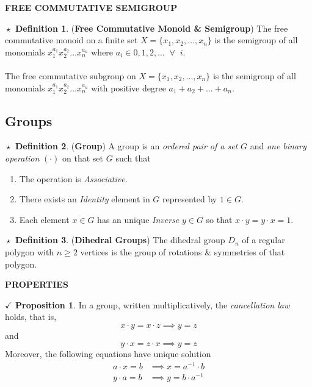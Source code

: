 \documentclass{article}
\theoremstyle{definition}
\newtheorem{definition}{$\boxed{\star}$ Definition}
\theoremstyle{remark}
\theoremstyle{definition}
\theoremstyle{definition}
\newtheorem{proposition}{$\checkmark$ Proposition}
\theoremstyle{definition}
\theoremstyle{proof}
\newcommand{\inv}[1]{#1^{-1}}
\begin{document}
\hrulefill
\textbf{FREE COMMUTATIVE SEMIGROUP}
\hrulefill
\begin{definition}
	(\textbf{Free Commutative Monoid \& Semigroup}) The free commutative monoid on a finite set $ X = \{x_1,x_2,\dots,x_n\} $ is the semigroup of all monomials $ x_1^{a_1}x_2^{a_2}\dots x_n^{a_n} $ where $ a_i \in 0,1,2,\dots\;\;\forall\;\;i $.\\\\
	The free commutative subgroup on $ X = \{x_1,x_2,\dots,x_n\} $ is the semigroup of all monomials $ x_1^{a_1}x_2^{a_2}\dots x_n^{a_n} $ with positive degree $ a_1 + a_2 + \dots + a_n $.
\end{definition}
\hrulefill
\newpage
\subsection{Groups}
\begin{definition}
(\textbf{Group})	A group is an \textit{ordered pair of a set} $ G $ and \textit{one binary operation} $ (\cdot) $ on that set $ G $ such that
\begin{enumerate}
	\item{The operation is \textit{Associative}.}
	\item{There exists an \textit{Identity} element in $ G $ represented by $ 1 \in G $.}
	\item{Each element $ x\in G $ has an unique \textit{Inverse} $ y\in G $ so that $ x\cdot y = y\cdot x = 1 $.}
\end{enumerate}
\end{definition}
\hrulefill
\begin{definition}
	(\textbf{Dihedral Groups}) The dihedral group $ D_n $ of a regular polygon with $ n\ge 2 $ vertices is the group of rotations \& symmetries of that polygon.
\end{definition}
\hrulefill
\textbf{PROPERTIES}
\hrulefill
\begin{proposition}
	In a group, written multiplicatively, the \emph{cancellation law} holds, that is,
	\[x\cdot y = x\cdot z \implies y = z\]
	and
	\[y\cdot x = z\cdot x \implies y = z\]
	Moreover, the following equations have unique solution
	\begin{equation*}
		\begin{split}
		a\cdot x = b &\implies x = \inv{a} \cdot b\\
		y\cdot a = b &\implies y = b\cdot\inv{a}
		\end{split}
	\end{equation*}
\end{proposition}
\end{document}
